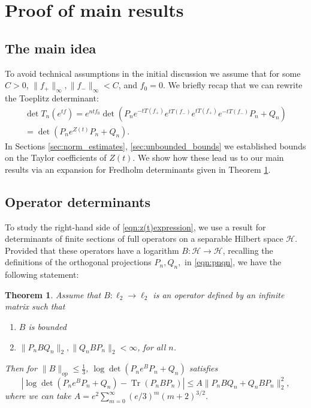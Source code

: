 \documentclass[11pt]{amsart}
\theoremstyle{plain}
\newtheorem{theorem}{Theorem}[section]
\theoremstyle{remark}
\DeclareMathOperator{\Tr}{Tr}
\numberwithin{equation}{section}
\begin{document}
\section{Proof of main results}\label{sec:proofs}
\subsection{The main idea}
%
%
%
%
%

To avoid technical assumptions in the initial discussion we assume that for some $C>0$, $\|f_+\|_{\infty}, \|f_-\|_\infty< C$, and $f_0=0$. 
We briefly recap that we can rewrite the Toeplitz determinant:
\begin{multline}\label{eqn:z(t)expression}
\det T_n (e^{tf})
=e^{ntf_0}
\det(P_n e^{-tT(f_+)}e^{tT(f_-)}e^{tT(f_+)}e^{-tT(f_-)}P_n+Q_n)
\\= \det(P_n e^{Z(t)}P_n+Q_n).
\end{multline}
In Sections \ref{sec:norm_estimates}, \ref{sec:unbounded_bounds} we established bounds on the Taylor coefficients of $Z(t)$. We show how these lead us to our main results via an expansion for Fredholm determinants given in Theorem \ref{thm:generalthm}.
%
%
%
\subsection{Operator determinants}\label{sec:operator_determinants}

To study the right-hand side of \eqref{eqn:z(t)expression}, we use a result for determinants of finite sections of full operators on a separable Hilbert space $\mathcal{H}$. 
%
%
%
%
Provided that these operators have a logarithm $B:\mathcal{H}\rightarrow\mathcal{H}$, %
%
%
%
recalling the definitions of the orthogonal projections $P_n, Q_n,$ in \eqref{eqn:pnqn}, we have the following statement:
\begin{theorem}\label{thm:generalthm}
Assume that $B:\ell_2\rightarrow\ell_2$ is an operator defined by an infinite matrix such that
\begin{enumerate}
\item $B$ is bounded
\item $\|P_nBQ_n\|_2, \|Q_nBP_n\|_2<\infty$, for all $n$.
\end{enumerate}
Then {for}  $ \|B\|_{op} \leq \frac{1}{3}$, $\log\det(P_ne^{B}P_n+Q_n)$ satisfies
$$\left|\log\det(P_ne^{B}P_n+Q_n)-\Tr (P_nBP_n)\right|\leq A \|P_nBQ_n+ Q_nBP_n\|_2^2,$$
where we can take $A=e^2\sum_{m=0}^{\infty} (e/3)^m (m+2)^{3/2}$.
\end{theorem}
\end{document}
